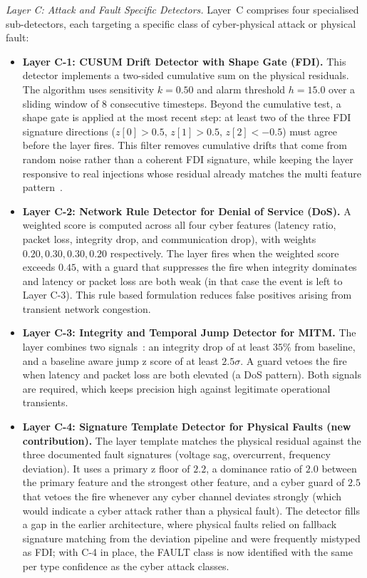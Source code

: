 \par \vspace{0.2cm}
\textit{Layer C: Attack and Fault Specific Detectors.} Layer~C comprises four specialised sub-detectors, each targeting a specific class of cyber-physical attack or physical fault:

\begin{itemize}
    \item \textbf{Layer C-1: CUSUM Drift Detector with Shape Gate (FDI).} This detector implements a two-sided cumulative sum on the physical residuals. The algorithm uses sensitivity $k = 0.50$ and alarm threshold $h = 15.0$ over a sliding window of 8 consecutive timesteps. Beyond the cumulative test, a shape gate is applied at the most recent step: at least two of the three FDI signature directions ($z[0] > 0.5$, $z[1] > 0.5$, $z[2] < -0.5$) must agree before the layer fires. This filter removes cumulative drifts that come from random noise rather than a coherent FDI signature, while keeping the layer responsive to real injections whose residual already matches the multi feature pattern~\cite{liu2009false}\cite{yan2020false}.

    \item \textbf{Layer C-2: Network Rule Detector for Denial of Service (DoS).} A weighted score is computed across all four cyber features (latency ratio, packet loss, integrity drop, and communication drop), with weights $0.20, 0.30, 0.30, 0.20$ respectively. The layer fires when the weighted score exceeds $0.45$, with a guard that suppresses the fire when integrity dominates and latency or packet loss are both weak (in that case the event is left to Layer C-3). This rule based formulation reduces false positives arising from transient network congestion.

    \item \textbf{Layer C-3: Integrity and Temporal Jump Detector for MITM.} The layer combines two signals~\cite{sadeghi2015security}: an integrity drop of at least $35\%$ from baseline, and a baseline aware jump z score of at least $2.5\sigma$. A guard vetoes the fire when latency and packet loss are both elevated (a DoS pattern). Both signals are required, which keeps precision high against legitimate operational transients.

    \item \textbf{Layer C-4: Signature Template Detector for Physical Faults (new contribution).} The layer template matches the physical residual against the three documented fault signatures (voltage sag, overcurrent, frequency deviation). It uses a primary z floor of $2.2$, a dominance ratio of $2.0$ between the primary feature and the strongest other feature, and a cyber guard of $2.5$ that vetoes the fire whenever any cyber channel deviates strongly (which would indicate a cyber attack rather than a physical fault). The detector fills a gap in the earlier architecture, where physical faults relied on fallback signature matching from the deviation pipeline and were frequently mistyped as FDI; with C-4 in place, the FAULT class is now identified with the same per type confidence as the cyber attack classes.
\end{itemize}


